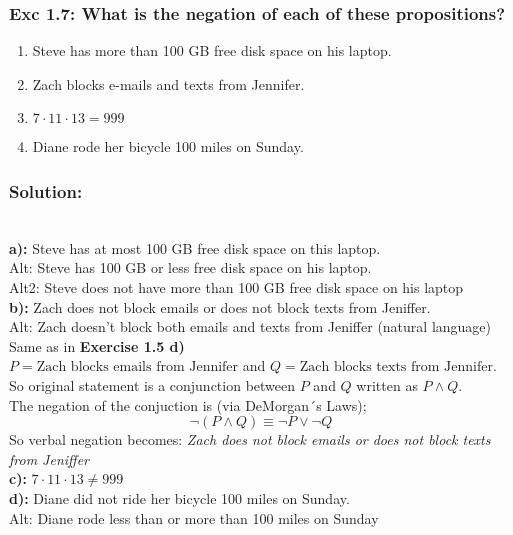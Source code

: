\subsubsection*{Exc 1.7: What is the negation of each of these propositions?}
\begin{enumerate}[label=(\alph*)]
\item Steve has more than 100 GB free disk space on his
laptop.
\item Zach blocks e-mails and texts from Jennifer.
\item $7 \cdot 11 \cdot 13 = 999$
\item Diane rode her bicycle 100 miles on Sunday.
\end{enumerate}
\subsubsection*{Solution:}
\\
\textbf{a):} Steve has at most 100 GB free disk space on this laptop.
\\ Alt: Steve has 100 GB or less free disk space on his laptop.
\\ Alt2: Steve does not have more than 100 GB free disk space on his laptop
\\
\textbf{b):} Zach does not block emails or does not block texts from Jeniffer.
\\ Alt: Zach doesn’t block both emails and texts from Jeniffer (natural language)
\\ Same as in \textbf{Exercise 1.5 d)}
\\ $P = \text{Zach blocks emails from Jennifer}$ and  $Q = \text{Zach blocks texts from Jennifer}$. So original statement is a conjunction between $P$ and $Q$ written as $P \land Q$. 
\\ The negation of the conjuction is (via DeMorgan´s Laws);
\begin{equation*}
\neg (P \land Q) \equiv \neg P \lor \neg Q    
\end{equation*}
So verbal negation becomes: \textit{Zach does not block emails or does not block texts from Jeniffer}
\\
\textbf{c):} $7 \cdot 11 \cdot 13 \neq 999$
\\
\textbf{d):} Diane did not ride her bicycle 100 miles on Sunday.
\\ Alt: Diane rode less than or more than 100 miles on Sunday 